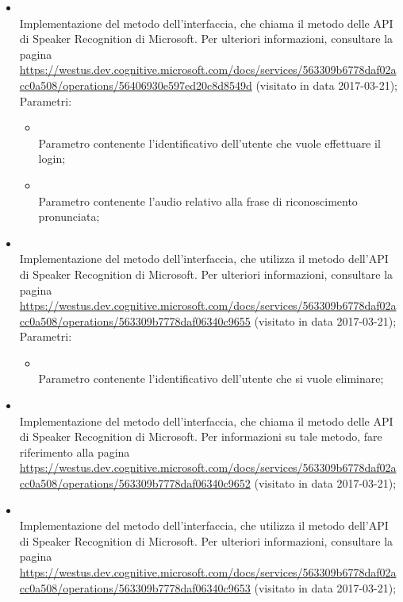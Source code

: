 \begin{itemize}
\begin{itemize}
		\item[]  \\		Implementazione del metodo dell'interfaccia, che chiama il metodo  delle API di Speaker Recognition di Microsoft. Per ulteriori informazioni, consultare la pagina \url{https://westus.dev.cognitive.microsoft.com/docs/services/563309b6778daf02acc0a508/operations/56406930e597ed20c8d8549d}  (visitato in data 2017-03-21);\\
		Parametri:
		\begin{itemize}
			\item {} \\
			Parametro contenente l'identificativo dell'utente che vuole effettuare il login;
			\item {} \\
			Parametro contenente l'audio relativo alla frase di riconoscimento pronunciata;
		\end{itemize}
		\item[]  \\		Implementazione del metodo dell'interfaccia, che utilizza il metodo  dell'API di Speaker Recognition di Microsoft. Per ulteriori informazioni, consultare la pagina \url{https://westus.dev.cognitive.microsoft.com/docs/services/563309b6778daf02acc0a508/operations/563309b7778daf06340c9655}  (visitato in data 2017-03-21);\\
		Parametri:
		\begin{itemize}
			\item {} \\
			Parametro contenente l'identificativo dell'utente che si vuole eliminare;
		\end{itemize}
		\item[]  \\		Implementazione del metodo dell'interfaccia, che chiama il metodo  delle API di Speaker Recognition di Microsoft. Per informazioni su tale metodo, fare riferimento alla pagina \url{https://westus.dev.cognitive.microsoft.com/docs/services/563309b6778daf02acc0a508/operations/563309b7778daf06340c9652}  (visitato in data 2017-03-21);\\
		\item[]  \\		Implementazione del metodo dell'interfaccia, che utilizza il metodo  dell'API di Speaker Recognition di Microsoft. Per ulteriori informazioni, consultare la pagina \url{https://westus.dev.cognitive.microsoft.com/docs/services/563309b6778daf02acc0a508/operations/563309b7778daf06340c9653}  (visitato in data 2017-03-21);\\

\end{itemize}
\end{itemize}
